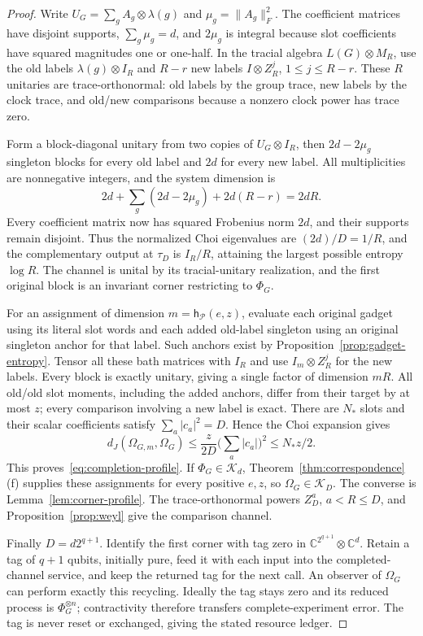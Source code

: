 \documentclass[11pt,a4paper]{article}
\theoremstyle{plain}
\theoremstyle{definition}
\theoremstyle{remark}
\newcommand{\dJ}{d_J}
\begin{document}
\begin{proof}
Write $U_G=\sum_gA_g\otimes\lambda(g)$ and $\mu_g=\|A_g\|_F^2$. The coefficient matrices have disjoint supports,
$\sum_g\mu_g=d$, and $2\mu_g$ is integral because slot coefficients have squared magnitudes one or one-half.
In the tracial algebra $L(G)\otimes M_R$, use the old labels $\lambda(g)\otimes I_R$ and $R-r$ new labels
$I\otimes Z_R^j$, $1\le j\le R-r$. These $R$ unitaries are trace-orthonormal: old labels by the group trace, new labels by the clock trace,
and old/new comparisons because a nonzero clock power has trace zero.

Form a block-diagonal unitary from two copies of $U_G\otimes I_R$, then $2d-2\mu_g$ singleton blocks for every old label and $2d$ for
every new label. All multiplicities are nonnegative integers, and the system dimension is
\[
2d+\sum_g(2d-2\mu_g)+2d(R-r)=2dR.
\]
Every coefficient matrix now has squared Frobenius norm $2d$, and their supports remain disjoint. Thus the normalized Choi eigenvalues
are $(2d)/D=1/R$, and the complementary output at $\tau_D$ is $I_R/R$, attaining the largest possible entropy $\log R$.
The channel is unital by its tracial-unitary realization, and the first original block is an invariant corner restricting to $\Phi_G$.

For an assignment of dimension $m=\mathsf h_{\mathcal P}(e,z)$, evaluate each original gadget using its literal slot words and each added
old-label singleton using an original singleton anchor for that label. Such anchors exist by Proposition~\ref{prop:gadget-entropy}.
Tensor all these bath matrices with $I_R$ and use $I_m\otimes Z_R^j$ for the new labels. Every block is exactly unitary, giving a single
factor of dimension $mR$. All old/old slot moments, including the added anchors, differ from their target by at most $z$; every comparison
involving a new label is exact. There are $N_*$ slots and their scalar coefficients satisfy $\sum_a|c_a|^2=D$. Hence the Choi expansion gives
\[
\dJ(\Omega_{G,m},\Omega_G)\le\frac{z}{2D}\Big(\sum_a|c_a|\Big)^2\le N_*z/2.
\]
This proves~\eqref{eq:completion-profile}. If $\Phi_G\in\mathcal K_d$, Theorem~\ref{thm:correspondence}(f) supplies these assignments for every
positive $e,z$, so $\Omega_G\in\mathcal K_D$. The converse is Lemma~\ref{lem:corner-profile}. The trace-orthonormal powers $Z_D^a$, $a<R\le D$,
and Proposition~\ref{prop:weyl} give the comparison channel.

Finally $D=d2^{q+1}$. Identify the first corner with tag zero in $\mathbb C^{2^{q+1}}\otimes\mathbb C^d$. Retain a tag of $q+1$ qubits,
initially pure, feed it with each input into the completed-channel service, and keep the returned tag for the next call. An observer of
$\Omega_G$ can perform exactly this recycling. Ideally the tag stays zero and its reduced process is $\Phi_G^{\otimes n}$; contractivity
therefore transfers complete-experiment error. The tag is never reset or exchanged, giving the stated resource ledger.
\end{proof}
\end{document}
